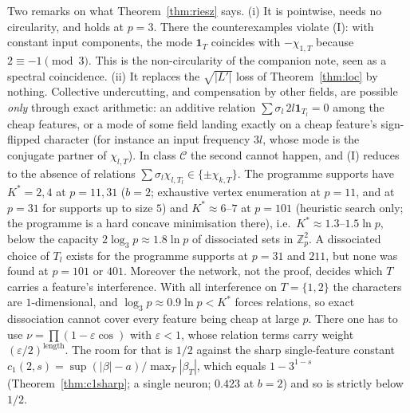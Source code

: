 \documentclass[11pt]{article}
\theoremstyle{definition}
\begin{document}
Two remarks on what Theorem~\ref{thm:riesz} says.  (i) It is pointwise, needs no circularity, and holds at $p=3$.  There
the counterexamples violate (I): with constant input components, the mode $\mathbf 1_T$ coincides with $-\chi_{1,T}$
because $2\equiv-1\pmod3$.  This is the non-circularity of the companion note, seen as a spectral coincidence.  (ii) It
replaces the $\sqrt{|L'|}$ loss of Theorem~\ref{thm:loc} by nothing.  Collective undercutting, and compensation by other
fields, are possible \emph{only} through exact arithmetic: an additive relation $\sum\sigma_l\,2l\mathbf 1_{T_l}=0$ among the cheap
features, or a mode of some field landing exactly on a cheap feature's sign-flipped character (for instance an input
frequency $3l$, whose mode is the conjugate partner of $\chi_{l,T}$).  In class $\mathcal C$ the second cannot happen, and
(I) reduces to the absence of relations $\sum\sigma_l\chi_{l,T_l}\in\{\pm\chi_{k,T}\}$.  The programme supports have $K^*=2,4$ at $p=11,31$ ($b=2$; exhaustive vertex enumeration at $p=11$, and at $p=31$ for
supports up to size $5$) and $K^*\approx6$--$7$ at $p=101$ (heuristic search only; the programme is a hard concave minimisation there), i.e.\ $K^*\approx1.3$--$1.5\ln p$, below the capacity $2\log_3p\approx1.8\ln p$ of dissociated sets in $\mathbb Z_p^2$.
A dissociated choice of $T_l$ exists for the programme supports at $p=31$ and $211$, but none was found at $p=101$ or $401$.  Moreover the network, not the
proof, decides which $T$ carries a feature's interference.  With all interference on $T=\{1,2\}$ the characters are
$1$-dimensional, and $\log_3p\approx0.9\ln p<K^*$ forces relations, so exact dissociation cannot cover every feature being cheap at large $p$.  There one has to use $\nu=\prod(1-\varepsilon\cos)$ with
$\varepsilon<1$, whose relation terms carry weight $(\varepsilon/2)^{\text{length}}$.  The room for that is $1/2$ against the sharp
single-feature constant $c_1(2,s)=\sup(|\beta|-a)/\max_T|\beta_T|$, which equals $1-3^{1-s}$ (Theorem~\ref{thm:c1sharp}; a single neuron;
$0.423$ at $b=2$) and so is strictly below $1/2$.
\end{document}

